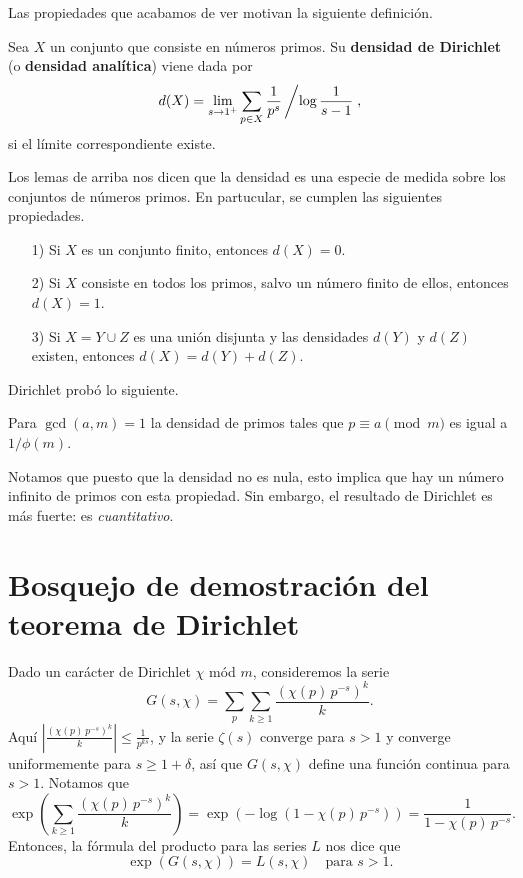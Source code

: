 \vspace{1em}

Las propiedades que acabamos de ver motivan la siguiente definición.

\begin{definicion}
  Sea $X$ un conjunto que consiste en números primos.
  Su \textbf{densidad de Dirichlet} (o \textbf{densidad analítica})
  viene dada por
  $$d (X) = \lim_{s \to 1^+} \sum_{p \in X} \frac{1}{p^s}\left/\log \frac{1}{s-1}\right.,$$
  si el límite correspondiente existe.
\end{definicion}

Los lemas de arriba nos dicen que la densidad es una especie de medida sobre los
conjuntos de números primos. En partucular, se cumplen las siguientes
propiedades.

\begin{enumerate}
\item[1)] Si $X$ es un conjunto finito, entonces $d (X) = 0$.

\item[2)] Si $X$ consiste en todos los primos, salvo un número finito de ellos,
  entonces $d (X) = 1$.

\item[3)] Si $X = Y \cup Z$ es una unión disjunta y las densidades $d (Y)$ y
  $d (Z)$ existen, entonces $d (X) = d (Y) + d (Z)$.
\end{enumerate}

Dirichlet probó lo siguiente.

\begin{teorema}
  Para $\gcd (a,m) = 1$ la densidad de primos tales que $p \equiv a \pmod{m}$
  es igual a $1/\phi(m)$.
\end{teorema}

Notamos que puesto que la densidad no es nula, esto implica que hay un número
infinito de primos con esta propiedad. Sin embargo, el resultado de Dirichlet
es más fuerte: es \emph{cuantitativo}.


\section{Bosquejo de demostración del teorema de Dirichlet}

Dado un carácter de Dirichlet $\chi$ mód $m$, consideremos la serie
$$G (s,\chi) = \sum_p \sum_{k\ge 1} \frac{(\chi (p)\,p^{-s})^k}{k}.$$
Aquí $\left|\frac{(\chi (p)\,p^{-s})^k}{k}\right| \le \frac{1}{p^{ks}}$,
y la serie $\zeta (s)$ converge para $s > 1$ y converge uniformemente para
$s \ge 1 + \delta$, así que $G (s,\chi)$ define una función continua para
$s > 1$. Notamos que
\[ \exp \left(\sum_{k\ge 1} \frac{(\chi (p)\,p^{-s})^k}{k}\right) =
\exp (-\log (1 - \chi (p)\,p^{-s})) = \frac{1}{1 - \chi(p)\,p^{-s}}. \]
Entonces, la fórmula del producto para las series $L$ nos dice que
$$\exp (G (s,\chi)) = L (s,\chi) \quad\text{para }s > 1.$$

